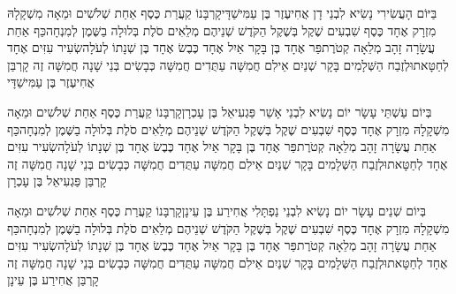 \documentclass[../main/main.tex]{subfiles}
\begin{document}
\begin{multicols*}{\ncols}
בַּיּוֹם הָעֲשִׂירִי נָשִׂיא לִבְנֵי דָן אֲחִיעֶזֶר בֶּן עַמִּישַׁדָּי\PreVerseSpace{}קָרְבָּנוֹ קַעֲרַת כֶּסֶף אַחַת שְׁלֹשִׁים וּמֵאָה מִשְׁקָלָהּ מִזְרָק אֶחָד כֶּסֶף שִׁבְעִים שֶׁקֶל בְּשֶׁקֶל הַקֹּדֶשׁ שְׁנֵיהֶם מְלֵאִים סֹלֶת בְּלוּלָה בַשֶּׁמֶן לְמִנְחָה\PreVerseSpace{}כַּף אַחַת עֲשָׂרָה זָהָב מְלֵאָה קְטֹרֶת\PreVerseSpace{}פַּר אֶחָד בֶּן בָּקָר אַיִל אֶחָד כֶּבֶשׂ אֶחָד בֶּן שְׁנָתוֹ לְעֹלָה\PreVerseSpace{}שְׂעִיר עִזִּים אֶחָד לְחַטָּאת\PreVerseSpace{}וּלְזֶבַח הַשְּׁלָמִים בָּקָר שְׁנַיִם אֵילִם חֲמִשָּׁה עַתֻּדִים חֲמִשָּׁה כְּבָשִׂים בְּנֵי שָׁנָה חֲמִשָּׁה זֶה קָרְבַּן אֲחִיעֶזֶר בֶּן עַמִּישַׁדָּי\OpenSection{}\par
{}בְּיוֹם עַשְׁתֵּי עָשָׂר יוֹם נָשִׂיא לִבְנֵי אָשֵׁר פַּגְעִיאֵל בֶּן עָכְרָן\PreVerseSpace{}קָרְבָּנוֹ קַעֲרַת כֶּסֶף אַחַת שְׁלֹשִׁים וּמֵאָה מִשְׁקָלָהּ מִזְרָק אֶחָד כֶּסֶף שִׁבְעִים שֶׁקֶל בְּשֶׁקֶל הַקֹּדֶשׁ שְׁנֵיהֶם מְלֵאִים סֹלֶת בְּלוּלָה בַשֶּׁמֶן לְמִנְחָה\PreVerseSpace{}כַּף אַחַת עֲשָׂרָה זָהָב מְלֵאָה קְטֹרֶת\PreVerseSpace{}פַּר אֶחָד בֶּן בָּקָר אַיִל אֶחָד כֶּבֶשׂ אֶחָד בֶּן שְׁנָתוֹ לְעֹלָה\PreVerseSpace{}שְׂעִיר עִזִּים אֶחָד לְחַטָּאת\PreVerseSpace{}וּלְזֶבַח הַשְּׁלָמִים בָּקָר שְׁנַיִם אֵילִם חֲמִשָּׁה עַתֻּדִים חֲמִשָּׁה כְּבָשִׂים בְּנֵי שָׁנָה חֲמִשָּׁה זֶה קָרְבַּן פַּגְעִיאֵל בֶּן עָכְרָן\OpenSection{}\par
{}בְּיוֹם שְׁנֵים עָשָׂר יוֹם נָשִׂיא לִבְנֵי נַפְתָּלִי אֲחִירַע בֶּן עֵינָן\PreVerseSpace{}קָרְבָּנוֹ קַעֲרַת כֶּסֶף אַחַת שְׁלֹשִׁים וּמֵאָה מִשְׁקָלָהּ מִזְרָק אֶחָד כֶּסֶף שִׁבְעִים שֶׁקֶל בְּשֶׁקֶל הַקֹּדֶשׁ שְׁנֵיהֶם מְלֵאִים סֹלֶת בְּלוּלָה בַשֶּׁמֶן לְמִנְחָה\PreVerseSpace{}כַּף אַחַת עֲשָׂרָה זָהָב מְלֵאָה קְטֹרֶת\PreVerseSpace{}פַּר אֶחָד בֶּן בָּקָר אַיִל אֶחָד כֶּבֶשׂ אֶחָד בֶּן שְׁנָתוֹ לְעֹלָה\PreVerseSpace{}שְׂעִיר עִזִּים אֶחָד לְחַטָּאת\PreVerseSpace{}וּלְזֶבַח הַשְּׁלָמִים בָּקָר שְׁנַיִם אֵילִם חֲמִשָּׁה עַתֻּדִים חֲמִשָּׁה כְּבָשִׂים בְּנֵי שָׁנָה חֲמִשָּׁה זֶה קָרְבַּן אֲחִירַע בֶּן עֵינָן\OpenSection{}\par

\end{multicols*}
\end{document}
